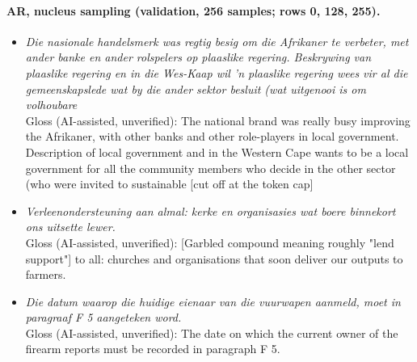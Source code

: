 \documentclass[11pt,a4paper]{article}
\begin{document}
\paragraph{AR, nucleus sampling (validation, 256 samples; rows 0, 128, 255).}
\begin{itemize}\small
\item[0] \emph{Die nasionale handelsmerk was regtig besig om die Afrikaner te verbeter, met ander banke en ander rolspelers op plaaslike regering. Beskrywing van plaaslike regering en in die Wes-Kaap wil 'n plaaslike regering wees vir al die gemeenskapslede wat by die ander sektor besluit (wat uitgenooi is om volhoubare}\\
Gloss (AI-assisted, unverified): The national brand was really busy improving the Afrikaner, with other banks and other role-players in local government. Description of local government and in the Western Cape wants to be a local government for all the community members who decide in the other sector (who were invited to sustainable [cut off at the token cap]
\item[128] \emph{Verleenondersteuning aan almal: kerke en organisasies wat boere binnekort ons uitsette lewer.}\\
Gloss (AI-assisted, unverified): [Garbled compound meaning roughly "lend support"] to all: churches and organisations that soon deliver our outputs to farmers.
\item[255] \emph{Die datum waarop die huidige eienaar van die vuurwapen aanmeld, moet in paragraaf F 5 aangeteken word.}\\
Gloss (AI-assisted, unverified): The date on which the current owner of the firearm reports must be recorded in paragraph F 5.
\end{itemize}
\end{document}
